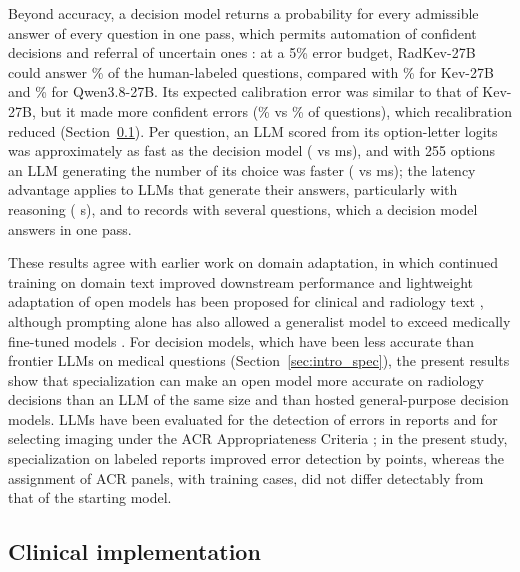 Beyond accuracy, a decision model returns a probability for every admissible answer of every question in one pass, which permits automation of confident decisions and referral of uncertain ones \citep{geifman2017selective}: at a 5\% error budget, RadKev-27B could answer \% of the human-labeled questions, compared with \% for Kev-27B and \% for Qwen3.8-27B. Its expected calibration error was similar to that of Kev-27B, but it made more confident errors (\% vs \% of questions), which recalibration reduced (Section~\ref{sec:disc_clinical}). %
Per question, an LLM scored from its option-letter logits was approximately as fast as the decision model ( vs  ms), and with 255 options an LLM generating the number of its choice was faster ( vs  ms); the latency advantage applies to LLMs that generate their answers, particularly with reasoning ( s), and to records with several questions, which a decision model answers in one pass. %

These results agree with earlier work on domain adaptation, in which continued training on domain text improved downstream performance \citep{gururangan2020dontstop} and lightweight adaptation of open models has been proposed for clinical and radiology text \citep{vanveen2024adapted,huisman2025lightweight,bluethgen2025bestpractices,savage2025opensource}, although prompting alone has also allowed a generalist model to exceed medically fine-tuned models \citep{nori2023medprompt}. For decision models, which have been less accurate than frontier LLMs on medical questions (Section~\ref{sec:intro_spec}), the present results show that specialization can make an open model more accurate on radiology decisions than an LLM of the same size and than hosted general-purpose decision models. LLMs have been evaluated for the detection of errors in reports \citep{gertz2024errors} and for selecting imaging under the ACR Appropriateness Criteria \citep{rau2023accgpt,yao2025radcases}; in the present study, specialization on  labeled reports improved error detection by  points, whereas the assignment of ACR panels, with  training cases, did not differ detectably from that of the starting model. %

\subsection{Clinical implementation}\label{sec:disc_clinical}

